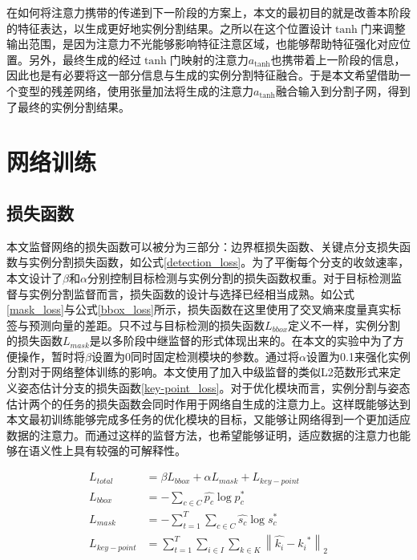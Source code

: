 在如何将注意力携带的传递到下一阶段的方案上，本文的最初目的就是改善本阶段的特征表达，以生成更好地实例分割结果。之所以在这个位置设计$\tanh$门来调整输出范围，是因为注意力不光能够影响特征注意区域，也能够帮助特征强化对应位置。另外，最终生成的经过$\tanh$门映射的注意力$a_{\tanh}$也携带着上一阶段的信息，因此也是有必要将这一部分信息与生成的实例分割特征融合。于是本文希望借助一个变型的残差网络，使用张量加法将生成的注意力$a_{\tanh}$融合输入到分割子网，得到了最终的实例分割结果。


\section{网络训练}
\label{sec:training}
\subsection{损失函数}
\label{subsec:lossfunction}

本文监督网络的损失函数可以被分为三部分：边界框损失函数、关键点分支损失函数与实例分割损失函数，如公式\eqref{detection_loss}。为了平衡每个分支的收敛速率，本文设计了$\beta$和$\alpha$分别控制目标检测与实例分割的损失函数权重。对于目标检测监督与实例分割监督而言，损失函数的设计与选择已经相当成熟。如公式\eqref{mask_loss}与公式\eqref{bbox_loss}所示，损失函数在这里使用了交叉熵来度量真实标签与预测向量的差距。只不过与目标检测的损失函数$L_{bbox}$定义不一样，实例分割的损失函数$L_{mask}$是以多阶段中继监督的形式体现出来的。在本文的实验中为了方便操作，暂时将$\beta$设置为0同时固定检测模块的参数。通过将$\alpha$设置为0.1来强化实例分割对于网络整体训练的影响。本文使用了加入中级监督的类似L2范数形式来定义姿态估计分支的损失函数\eqref{key-point_loss}。对于优化模块而言，实例分割与姿态估计两个的任务的损失函数会同时作用于网络自生成的注意力上。这样既能够达到本文最初训练能够完成多任务的优化模块的目标，又能够让网络得到一个更加适应数据的注意力。而通过这样的监督方法，也希望能够证明，适应数据的注意力也能够在语义性上具有较强的可解释性。

\begin{align}
L_{total} &= \beta L_{bbox} + \alpha L_{mask} + L_{key-point}\label{detection_loss}\\
L_{bbox} &= -\sum_{c \in C}{\hat{p_c} \log{p_c^{*}}}\label{bbox_loss}\\
L_{mask} &= -\sum_{t=1}^{T}\sum_{c \in C}{\hat{s_c} \log{s_c^{*}}}\label{mask_loss}\\
L_{key-point} &= \sum_{t=1}^{T}\sum_{i \in I}\sum_{k \in K}{\left\| \hat{k_i} - {k_i}^{*} \right\|_2}\label{key-point_loss}
\end{align}

